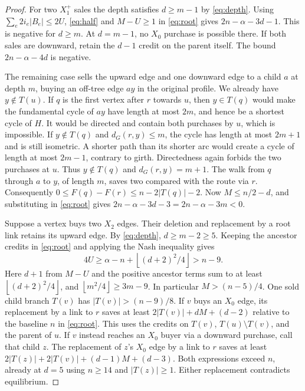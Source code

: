 \documentclass[11pt]{article}
\newcommand{\dG}{d_G}
\newcommand{\floor}[1]{\left\lfloor#1\right\rfloor}
\newcommand{\abs}[1]{\left|#1\right|}
\begin{document}
\begin{proof}
For two \(X_1^+\) sales the depth satisfies \(d\ge m-1\) by
\eqref{eq:depth}. Using \(\sum_e2i_e\abs{B_e}\le2U\),
\eqref{eq:half} and \(M-U\ge1\) in \eqref{eq:root} gives
\(2n-\alpha-3d-1\). This is negative for \(d\ge m\).
At \(d=m-1\), no \(X_0\) purchase is possible there. If both sales
are downward, retain the \(d-1\) credit on the parent itself.
The bound \(2n-\alpha-4d\) is negative.

The remaining case sells the upward edge and one downward edge
to a child \(a\) at depth \(m\), buying an off-tree edge \(ay\)
in the original profile. We already have \(y\notin T(u)\).
If \(q\) is the first vertex after \(r\) towards \(u\), then
\(y\in T(q)\) would make the fundamental cycle of \(ay\) have
length at most \(2m\), and hence be a shortest cycle of \(H\).
It would be directed and contain both purchases by \(u\),
which is impossible. If \(y\notin T(q)\) and \(\dG(r,y)\le m\),
the cycle has length at most \(2m+1\) and is still isometric.
A shorter path than its shorter arc would create a cycle of
length at most \(2m-1\), contrary to girth. Directedness again
forbids the two purchases at \(u\). Thus \(y\notin T(q)\) and
\(\dG(r,y)=m+1\). The walk from \(q\) through \(a\) to \(y\),
of length \(m\), saves two compared with the route via \(r\).
Consequently \(0\le F(q)-F(r)\le n-2\abs{T(q)}-2\). Now
\(M\le n/2-d\), and substituting in \eqref{eq:root} gives
\(2n-\alpha-3d-3=2n-\alpha-3m<0\).

Suppose a vertex buys two \(X_2\) edges. Their deletion and
replacement by a root link retains its upward edge. By
\eqref{eq:depth}, \(d\ge m-2\ge5\). Keeping the ancestor
credits in \eqref{eq:root} and applying the Nash inequality gives
\[
 4U \ge \alpha-n+\floor{(d+2)^2/4}>n-9.
\]
Here \(d+1\) from \(M-U\) and the positive ancestor terms sum
to at least \(\floor{(d+2)^2/4}\), and
\(\floor{m^2/4}\ge 3m-9\). In particular \(M>(n-5)/4\).
One sold child branch \(T(v)\) has \(\abs{T(v)}>(n-9)/8\).
If \(v\) buys an \(X_0\) edge, its replacement by a link to \(r\)
saves at least \(2\abs{T(v)}+dM+(d-2)\) relative to the baseline
\(n\) in \eqref{eq:root}. This uses the credits on \(T(v)\),
\(T(u)\setminus T(v)\), and the parent of \(u\).
If \(v\) instead reaches an \(X_0\) buyer via a downward purchase,
call that child \(z\). The replacement of \(z\)'s \(X_0\) edge
by a link to \(r\) saves at least
\(2\abs{T(z)}+2\abs{T(v)}+(d-1)M+(d-3)\).
Both expressions exceed \(n\), already at \(d=5\) using \(n\ge14\)
and \(\abs{T(z)}\ge1\). Either replacement contradicts equilibrium.
\end{proof}
\end{document}
